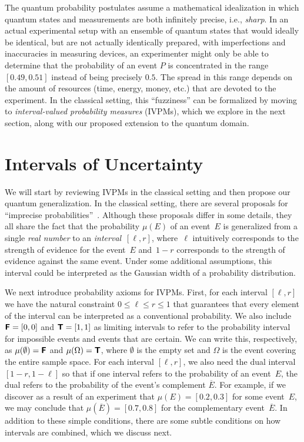\documentclass[english,reprint, aps, prl,superscriptaddress, showpacs,
showkeys, longbibliography, amsmath, amssymb, floatfix]{revtex4-1}
\theoremstyle{plain}
\theoremstyle{definition}
\newcommand{\imposs}{\textbf{\textsf{F}}}
\newcommand{\necess}{\textbf{\textsf{T}}}
\begin{document}
The quantum probability postulates assume a mathematical idealization
in which quantum states and measurements are both infinitely
precise, i.e., {\it sharp}. 
In an actual experimental setup with an ensemble of quantum
states that would ideally be identical, but are not actually
identically prepared, with imperfections and inaccuracies in measuring
devices, an experimenter might only be able to determine that the
probability of an event $P$ is concentrated in the range $[0.49,0.51]$
instead of being precisely $0.5$. The spread in this range depends on
the amount of resources (time, energy, money, etc.)  that are devoted
to the experiment. In the classical setting, this ``fuzziness'' can be
formalized by moving to \emph{interval-valued probability measures}
(IVPMs), which we explore in the next section, along with our proposed
extension to the quantum domain.

\section{Intervals of Uncertainty}
\label{sec:Interval-Uncertainty}

We will start by reviewing IVPMs in the classical setting and then
propose our quantum generalization. In the classical setting, there
are several proposals for ``imprecise
probabilities''~\cite{Dempster1967,Shafer1976,GilboaSchmeidler1994,Marinacci1999,Weichselberger2000,JamisonLodwick2004,HuberRonchetti2009,Grabisch2016}.
Although these proposals differ in some details, they all share the
fact that the probability $\mu(E)$ of an event~$E$ is generalized from
a single \emph{real number} to an \emph{interval}~$[\ell,r]$,
where~$\ell$ intuitively corresponds to the strength of evidence for
the event~$E$ and~$1-r$ corresponds to the strength of evidence
against the same event. Under some additional assumptions, this
interval could be interpreted as the Gaussian width of a probability
distribution.

We next introduce probability axioms for IVPMs. First, for each
interval $[\ell,r]$ we have the natural constraint
$0 \leq \ell \leq r \leq 1$ that guarantees that every element of the
interval can be interpreted as a conventional probability. We also
include $\imposs=[0,0]$ and $\necess=[1,1]$ as limiting intervals to
refer to the probability interval for impossible events and events
that are certain. We can write this, respectively, as
$\mu(\emptyset)=\imposs$ and $\mu(\Omega)=\necess$, where $\emptyset$
is the empty set and $\Omega$ is the event covering the entire sample
space.  For each interval $[\ell,r]$, we also need the dual interval
$[1-r,1-\ell]$ so that if one interval refers to the probability of an
event~$E$, the dual refers to the probability of the event's
complement $\overline{E}$.  For example, if we discover as a result of
an experiment that $\mu(E) = [0.2,0.3]$ for some event~$E$, we may
conclude that $\mu\left(\overline{E}\right) = [0.7,0.8]$ for the
complementary event~$\overline{E}$. In addition to these simple
conditions, there are some subtle conditions on how intervals are
combined, which we discuss next.
\end{document}

